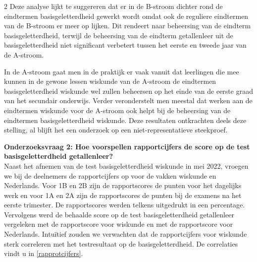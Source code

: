 \begin{multicols}{2}
Deze analyse lijkt te suggereren dat er in de B-stroom dichter rond de eindtermen basisgeletterdheid gewerkt wordt omdat ook de reguliere eindtermen van de B-stroom er meer op lijken. Dit rendeert naar beheersing van de eindterm  basisgeletterdheid, terwijl de beheersing van de eindterm getallenleer uit de basisgeletterdheid niet significant verbetert tussen het eerste en tweede jaar van de A-stroom.

In de A-stroom gaat men in de praktijk er vaak vanuit dat leerlingen die mee kunnen in de gewone lessen wiskunde van de A-stroom de eindtermen basisgeletterdheid wiskunde wel zullen beheersen op het einde van de eerste graad van het secundair onderwijs. Verder veronderstelt men meestal dat werken aan de eindtermen wiskunde voor de A-stroom ook helpt bij de beheersing van de eindtermen basisgeletterdheid wiskunde. Deze resultaten ontkrachten deels deze stelling, al blijft het een onderzoek op een niet-representatieve steekproef. 

\textbf{Onderzoeksvraag 2: Hoe voorspellen rapportcijfers de score op de test basisgeletterdheid getallenleer?}\\

Naast het afnemen van de test basisgeletterdheid wiskunde in mei 2022, vroegen we bij de deelnemers de rapportcijfers op voor de vakken wiskunde en Nederlands. Voor 1B en 2B zijn de rapportscores de punten voor het dagelijks werk en voor 1A en 2A zijn de rapportscores de punten bij de examens na het eerste trimester. De rapportscores werden telkens uitgedrukt in een percentage. Vervolgens werd de behaalde score op de test basisgeletterdheid getallenleer vergeleken met de rapportscore voor wiskunde en met de rapportscore voor Nederlands. Intuïtief zouden we verwachten dat de rapportcijfers voor wiskunde sterk correleren met het testresultaat op de basisgeletterdheid. De correlaties vindt u in \autoref{rapprotcijfers}. 
\end{multicols}

